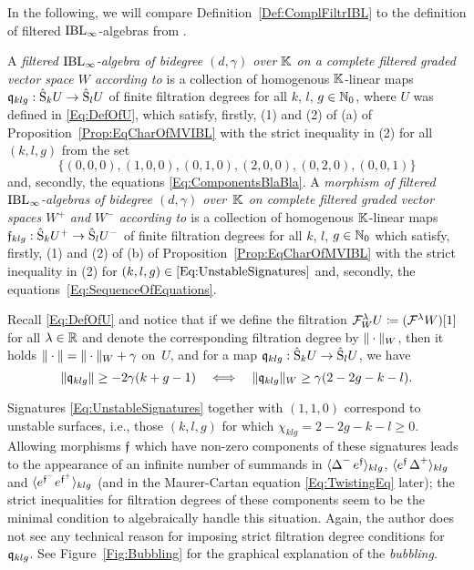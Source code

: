 \documentclass[\MainFolder/Text.tex]{subfiles}
\begin{document}
In the following, we will compare Definition~\ref{Def:ComplFiltrIBL} to the definition of filtered $\mathrm{IBL}_\infty$-algebras from \cite[Section~8]{Cieliebak2015}.

A \emph{filtered $\mathrm{IBL}_\infty$-algebra of bidegree $(d,\gamma)$ over $\mathbb{K}$ on a complete filtered graded vector space $W$ according to \cite{Cieliebak2015}} is a collection of homogenous $\mathbb{K}$-linear maps $\mathfrak{q}_{klg}:\hat{\mathrm{S}}_k U\rightarrow\hat{\mathrm{S}}_l U$ of finite filtration degrees for all $k$, $l$, $g\in \mathbb{N}_0$, where $U$ was defined in \eqref{Eq:DefOfU}, which satisfy, firstly, (1) and (2) of (a) of Proposition~\ref{Prop:EqCharOfMVIBL} with the strict inequality in (2) for all $(k,l,g)$ from the set 
\begin{equation}\label{Eq:UnstableSignatures}
\bigl\{(0,0,0), (1,0,0), (0,1,0), (2,0,0), (0,2,0), (0,0,1)\bigr\}
\end{equation}
and, secondly, the equations \eqref{Eq:ComponentsBlaBla}. A \emph{morphism of filtered $\mathrm{IBL}_\infty$-algebras of bidegree $(d,\gamma)$ over~$\mathbb{K}$ on complete filtered graded vector spaces $W^+$ and $W^-$ according to \cite{Cieliebak2015}} 
is a collection of homogenous $\mathbb{K}$-linear maps $\mathfrak{f}_{klg}: \hat{\mathrm{S}}_k U^+ \rightarrow \hat{\mathrm{S}}_l U^-$ of finite filtration degrees for all $k$, $l$, $g\in \mathbb{N}_0$ which satisfy, firstly, (1) and (2) of (b) of Proposition~\ref{Prop:EqCharOfMVIBL} with the strict inequality in (2) for $(k,l,g)\in\eqref{Eq:UnstableSignatures}$ and, secondly, the equations~\eqref{Eq:SequenceOfEquations}.

Recall \eqref{Eq:DefOfU} and notice that if we define the filtration $\mathcal{F}_W^\lambda U \coloneqq (\mathcal{F}^\lambda W)[1]$ for all $\lambda\in \mathbb{R}$ and denote the corresponding filtration degree by $\| \cdot \|_W$, then it holds $\| \cdot \| = \| \cdot \|_W + \gamma$ on~$U$, and for a map $\mathfrak{q}_{klg}:\hat{\mathrm{S}}_k U\rightarrow\hat{\mathrm{S}}_l U$, we have
$$ \| \mathfrak{q}_{klg} \|\ge -2\gamma(k+g-1)\quad\Longleftrightarrow\quad\| \mathfrak{q}_{klg} \|_W \ge \gamma(2-2g-k-l). $$

Signatures \eqref{Eq:UnstableSignatures} together with $(1,1,0)$ correspond to unstable surfaces, i.e., those $(k,l,g)$ for which $\chi_{klg}=2-2g-k-l \ge 0$. Allowing morphisms $\mathfrak{f}$ which have non-zero components of these signatures leads to the appearance of an infinite number of summands in $\langle \operatorname{\Delta}^- e^{\mathfrak{f}} \rangle_{klg}$, $\langle e^{\mathfrak{f}}\operatorname{\Delta}^+\rangle_{klg}$ and $\langle e^{\mathfrak{f}^-}e^{\mathfrak{f}^+}\rangle_{klg}$ (and in the Maurer-Cartan equation \eqref{Eq:TwistingEq} later); the strict inequalities for filtration degrees of these components seem to be the minimal condition to algebraically handle this situation. Again, the author does not see any technical reason for imposing strict filtration degree conditions for~$\mathfrak{q}_{klg}$. See Figure~\ref{Fig:Bubbling} for the graphical explanation of the \emph{bubbling}.
\end{document}
